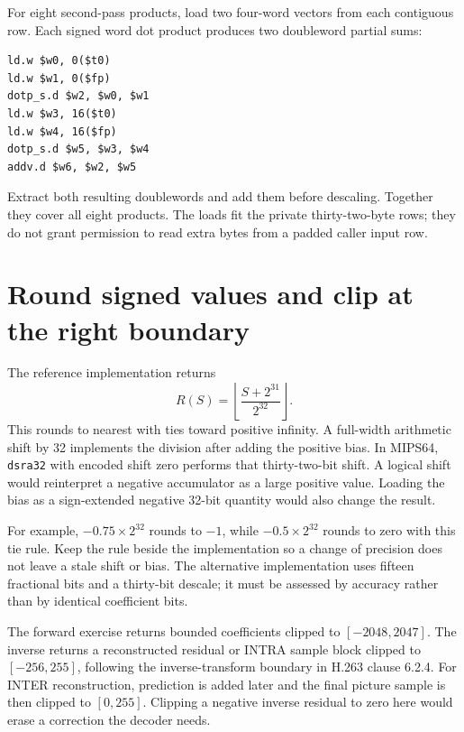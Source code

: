 For eight second-pass products, load two four-word vectors from each contiguous
row. Each signed word dot product produces two doubleword partial sums:
\begin{verbatim}
ld.w $w0, 0($t0)
ld.w $w1, 0($fp)
dotp_s.d $w2, $w0, $w1
ld.w $w3, 16($t0)
ld.w $w4, 16($fp)
dotp_s.d $w5, $w3, $w4
addv.d $w6, $w2, $w5
\end{verbatim}
Extract both resulting doublewords and add them before descaling. Together they
cover all eight products. The loads fit the private thirty-two-byte rows; they
do not grant permission to read extra bytes from a padded caller input row.

\section{Round signed values and clip at the right boundary}
The reference implementation returns
\[
  R(S)=\left\lfloor\frac{S+2^{31}}{2^{32}}\right\rfloor.
\]
This rounds to nearest with ties toward positive infinity. A full-width
arithmetic shift by 32 implements the division after adding the positive bias.
In MIPS64, \texttt{dsra32} with encoded shift zero performs that thirty-two-bit
shift. A logical shift would reinterpret a negative accumulator as a large
positive value. Loading the bias as a sign-extended negative 32-bit quantity
would also change the result.

For example, $-0.75\times2^{32}$ rounds to $-1$, while
$-0.5\times2^{32}$ rounds to zero with this tie rule. Keep the rule beside the
implementation so a change of precision does not leave a stale shift or bias.
The alternative implementation uses fifteen fractional bits and a thirty-bit
descale; it must be assessed by accuracy rather than by identical coefficient bits.

The forward exercise returns bounded coefficients clipped to $[-2048,2047]$.
The inverse returns a reconstructed residual or INTRA sample block clipped to
$[-256,255]$, following the inverse-transform boundary in H.263 clause 6.2.4.
For INTER reconstruction, prediction is added later and the final picture sample
is then clipped to $[0,255]$. Clipping a negative inverse residual to zero here
would erase a correction the decoder needs.
